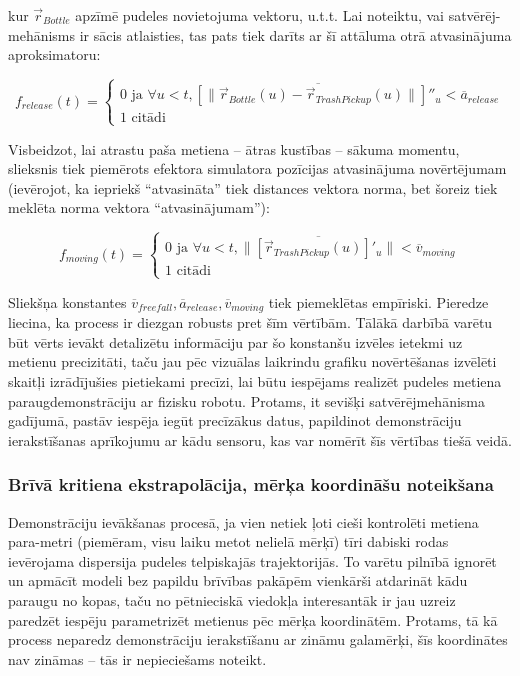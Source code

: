 \documentclass[12pt, a4paper]{article}
\numberwithin{equation}{section} %
\begin{document}
kur $\vec{r}_{Bottle}$ apzīmē pudeles novietojuma vektoru, u.t.t. Lai noteiktu, vai satvērēj-mehānisms ir sācis atlaisties, tas pats tiek darīts ar šī attāluma otrā atvasinājuma aproksimatoru:


\begin{equation}
    f_{release} (t) = \begin{cases}
        0 \text{ ja } \forall u < t, \overline{ \left [ \lVert \vec{r}_{Bottle}(u) - \vec{r}_{TrashPickup}(u)  \rVert \right ] ''_u} < \overline{a}_{release} \\
        1 \text{ citādi }
    \end{cases}
\end{equation}

Visbeidzot, lai atrastu paša metiena -- ātras kustības -- sākuma momentu, slieksnis tiek piemērots efektora simulatora pozīcijas atvasinājuma novērtējumam (ievērojot, ka iepriekš ``atvasināta'' tiek distances vektora norma, bet šoreiz tiek meklēta norma vektora ``atvasinājumam''):

\begin{equation}
    f_{moving} (t) = \begin{cases}
        0 \text{ ja } \forall u < t,  \lVert \overline{\left [ \vec{r}_{TrashPickup}(u) \right ]'_u} \rVert  < \overline{v}_{moving} \\
        1 \text{ citādi }
    \end{cases}
\end{equation}

Sliekšņa konstantes $\overline{v}_{freefall}, \overline{a}_{release}, \overline{v}_{moving}$ tiek piemeklētas empīriski. Pieredze liecina, ka process ir diezgan robusts pret šīm vērtībām. Tālākā darbībā varētu būt vērts ievākt detalizētu informāciju par šo konstanšu izvēles ietekmi uz metienu precizitāti, taču jau pēc vizuālas laikrindu grafiku novērtēšanas izvēlēti skaitļi izrādījušies pietiekami precīzi, lai būtu iespējams realizēt pudeles metiena paraugdemonstrāciju ar fizisku robotu. Protams, it sevišķi satvērējmehānisma gadījumā, pastāv iespēja iegūt precīzākus datus, papildinot demonstrāciju ierakstīšanas aprīkojumu ar kādu sensoru, kas var nomērīt šīs vērtības tiešā veidā.

\subsubsection{Brīvā kritiena ekstrapolācija, mērķa koordināšu noteikšana}

Demonstrāciju ievākšanas procesā, ja vien netiek ļoti cieši kontrolēti metiena para-metri (piemēram, visu laiku metot nelielā mērķī) tīri dabiski rodas ievērojama dispersija pudeles telpiskajās trajektorijās. To varētu pilnībā ignorēt un apmācīt modeli bez papildu brīvības pakāpēm vienkārši atdarināt kādu paraugu no kopas, taču no pētnieciskā viedokļa interesantāk ir jau uzreiz paredzēt iespēju parametrizēt metienus pēc mērķa koordinātēm. Protams, tā kā process neparedz demonstrāciju ierakstīšanu ar zināmu galamērķi, šīs koordinātes nav zināmas -- tās ir nepieciešams noteikt.
\end{document}

